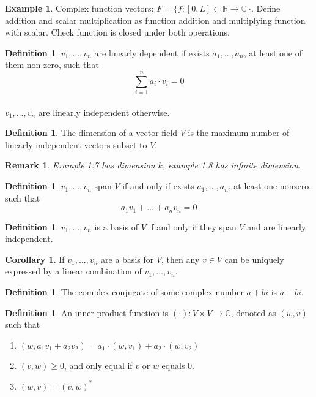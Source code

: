 \documentclass[12pt]{article}
\def\R{{\mathbb{R}}}
\def\C{{\mathbb{C}}}
\numberwithin{theorem}{section}
\newtheorem{remark}[theorem]{Remark}
\theoremstyle{definition}
\newtheorem{definition}[theorem]{Definition}
\newtheorem{example}[theorem]{Example}
\newtheorem{corollary}[theorem]{Corollary}
\begin{document}
\begin{example}
    Complex function vectors: $F = \{f:[0,L]\subset\R\to\C\}$. Define addition and scalar multiplication as function addition and multiplying function with scalar. Check function is closed under both operations.
\end{example}

\begin{definition}
    $v_1, \dots, v_n$ are linearly dependent if exists $a_1, \dots, a_n$, at least one of them non-zero, such that
    $$\sum_{i=1}^{n} a_i\cdot v_i = 0$$\\
    $v_1, \dots, v_n$ are linearly independent otherwise.
\end{definition}

\begin{definition}
    The dimension of a vector field $V$ is the maximum number of linearly independent vectors subset to $V$.
\end{definition}

\begin{remark}
    Example 1.7 has dimension $k$, example 1.8 has infinite dimension.
\end{remark}

\begin{definition}
    $v_1, \dots, v_n$ span $V$ if and only if exists $a_1, \dots, a_n$, at least one nonzero, such that
    $$a_1v_1 + \dots + a_nv_n = 0$$
\end{definition}

\begin{definition}
    $v_1, \dots, v_n$ is a basis of $V$ if and only if they span $V$ and are linearly independent.
\end{definition}

\begin{corollary}
    If $v_1,\dots,v_n$ are a basis for $V$, then any $v\in V$ can be uniquely expressed by a linear combination of $v_1,\dots,v_n$.
\end{corollary}

\begin{definition}
    The complex conjugate of some complex number $a+bi$ is $a-bi$.    
\end{definition}

\begin{definition}
    An inner product function is $(\cdot):V\times V\to\C$, denoted as $(w,v)$ such that
    \begin{enumerate}
        \item $(w, a_1 v_1 + a_2 v_2) = a_1 \cdot (w, v_1) + a_2 \cdot (w, v_2)$
        \item $(v,w) \geq 0$, and only equal if $v$ or $w$ equals 0.
        \item $(w,v) = (v,w)^*$
    \end{enumerate}
\end{definition}
\end{document}
